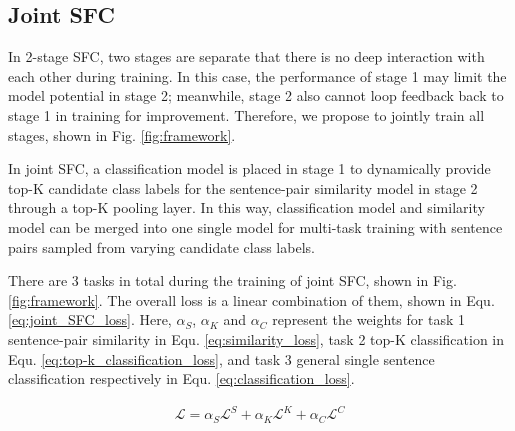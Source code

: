 \subsection{Joint SFC}
In 2-stage SFC, two stages are separate that there is no deep interaction with each other during training. 
In this case, the performance of stage 1 may limit the model potential in stage 2; 
meanwhile, stage 2 also cannot loop feedback back to stage 1 in training for improvement. 
Therefore, we propose to jointly train all stages, shown in Fig. \ref{fig:framework}.

In joint SFC, a classification model is placed in stage 1 to dynamically provide top-K candidate class labels for the sentence-pair similarity model in stage 2 through a top-K pooling layer.
In this way, classification model and similarity model can be merged into one single model for multi-task training with sentence pairs sampled from varying candidate class labels.

There are 3 tasks in total during the training of joint SFC, shown in Fig. \ref{fig:framework}. 
The overall loss is a linear combination of them, shown in Equ. \ref{eq:joint_SFC_loss}. 
Here, $\alpha_S$, $\alpha_K$ and $\alpha_C$ represent the weights for task 1 sentence-pair similarity in Equ. \ref{eq:similarity_loss}, task 2 top-K classification in Equ. \ref{eq:top-k_classification_loss}, and task 3 general single sentence classification respectively in Equ.  \ref{eq:classification_loss}.

\vspace{-1.5em}
\begin{align}
  \mathcal{L} = \alpha_S \mathcal{L}^S + \alpha_K \mathcal{L}^K + \alpha_C \mathcal{L}^C
  \label{eq:joint_SFC_loss}
\end{align}
\vspace{-1.5em}
